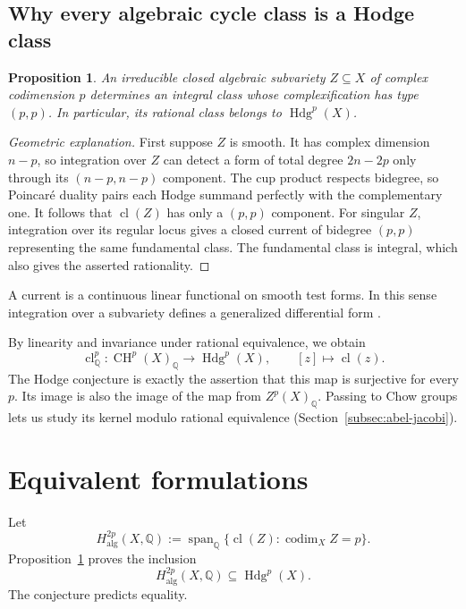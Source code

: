 \documentclass[11pt,reqno]{amsart}
\newtheorem{proposition}[theorem]{Proposition}
\theoremstyle{definition}
\theoremstyle{remark}
\numberwithin{equation}{section}
\newcommand{\Q}{\mathbb{Q}}
\DeclareMathOperator{\CH}{CH}
\DeclareMathOperator{\Hdg}{Hdg}
\DeclareMathOperator{\cl}{cl}
\begin{document}
\subsection{Why every algebraic cycle class is a Hodge class}

\begin{proposition}\label{prop:necessary}
An irreducible closed algebraic subvariety $Z\subseteq X$ of complex
codimension $p$ determines an integral class whose complexification has type
$(p,p)$. In particular, its rational class belongs to $\Hdg^p(X)$.
\end{proposition}

\begin{proof}[Geometric explanation]
First suppose $Z$ is smooth. It has complex dimension $n-p$, so integration
over $Z$ can detect a form of total degree $2n-2p$ only through its
$(n-p,n-p)$ component. The cup product respects bidegree, so Poincar\'e
duality pairs each Hodge summand perfectly with the complementary one.
It follows that $\cl(Z)$ has only a $(p,p)$ component. For singular $Z$,
integration over its regular locus gives a closed current of bidegree
$(p,p)$ representing the same fundamental class. The fundamental class
is integral, which also gives the asserted rationality.
\end{proof}

A current is a continuous linear functional on smooth test forms.
In this sense integration over a subvariety defines a generalized
differential form \cite{griffithsharris1978,voisin2003hodge2}.

By linearity and invariance under rational equivalence, we obtain
\begin{equation}\label{eq:cyclemap}
 \cl^p_{\Q}:\CH^p(X)_{\Q}\longrightarrow\Hdg^p(X),
 \qquad [z]\longmapsto\cl(z).
\end{equation}
The Hodge conjecture is exactly the assertion that this map is surjective
for every $p$. Its image is also the image of the map from
$Z^p(X)_{\Q}$. Passing to Chow groups lets us study its kernel
modulo rational equivalence (Section~\ref{subsec:abel-jacobi}).

\section{Equivalent formulations}

Let
\[
 H^{2p}_{\mathrm{alg}}(X,\Q):=
 \operatorname{span}_{\Q}\{\cl(Z):\operatorname{codim}_X Z=p\}.
\]
Proposition~\ref{prop:necessary} proves the inclusion
\[
 H^{2p}_{\mathrm{alg}}(X,\Q)\subseteq\Hdg^p(X).
\]
The conjecture predicts equality.
\end{document}
